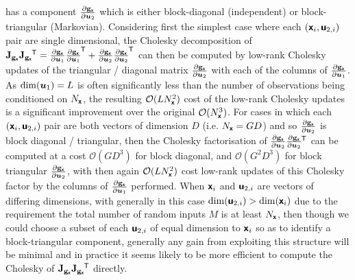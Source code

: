 has a component $\frac{\partial {\mathbf{g}}_{\boldsymbol{\mathsf{x}}}}{\partial \boldsymbol{u}_2}$ which is either block-diagonal (independent) or block-triangular (Markovian). Considering first the simplest case where each $(\boldsymbol{\mathsf{x}}_i,\boldsymbol{\mathsf{u}}_{2,i})$ pair are single dimensional, the Cholesky decomposition of $\mathbf{J}_{{\mathbf{g}}_{\boldsymbol{\mathsf{x}}}}\mathbf{J}_{{\mathbf{g}}_{\boldsymbol{\mathsf{x}}}}\phantom{}^{\mkern-1.5mu\mathsf{T}} = \frac{\partial {\mathbf{g}}_{\boldsymbol{\mathsf{x}}}}{\partial \boldsymbol{u}_1}\frac{\partial {\mathbf{g}}_{\boldsymbol{\mathsf{x}}}}{\partial \boldsymbol{u}_1}^{\mkern-1.5mu\mathsf{T}} + \frac{\partial {\mathbf{g}}_{\boldsymbol{\mathsf{x}}}}{\partial \boldsymbol{u}_2} \frac{\partial {\mathbf{g}}_{\boldsymbol{\mathsf{x}}}}{\partial \boldsymbol{u}_2}^{\mkern-1.5mu\mathsf{T}}$ can then be computed by low-rank Cholesky updates of the triangular / diagonal matrix $\frac{\partial {\mathbf{g}}_{\boldsymbol{\mathsf{x}}}}{\partial \boldsymbol{u}_2}$ with each of the columns of $\frac{\partial {\mathbf{g}}_{\boldsymbol{\mathsf{x}}}}{\partial \boldsymbol{u}_1}$. As $\dim(\boldsymbol{u}_1) = L$ is often significantly less than the number of observations being conditioned on $N_{\boldsymbol{\mathsf{x}}}$, the resulting $\mathcal{O}(LN_{\boldsymbol{\mathsf{x}}}^2)$ cost of the low-rank Cholesky updates is a significant improvement over the original $\mathcal{O}(N_{\boldsymbol{\mathsf{x}}}^3)$. For cases in which each $(\boldsymbol{\mathsf{x}}_i,\boldsymbol{\mathsf{u}}_{2,i})$ pair are both vectors of dimension $D$ (i.e. $N_{\boldsymbol{\mathsf{x}}} = GD$) and so $\frac{\partial {\mathbf{g}}_{\boldsymbol{\mathsf{x}}}}{\partial \boldsymbol{u}_2}$ is block diagonal / triangular, then the Cholesky factorisation of  $\frac{\partial {\mathbf{g}}_{\boldsymbol{\mathsf{x}}}}{\partial \boldsymbol{u}_2} \frac{\partial {\mathbf{g}}_{\boldsymbol{\mathsf{x}}}}{\partial \boldsymbol{u}_2}\phantom{}^{\mkern-1.5mu\mathsf{T}}$ can be computed at a cost $\mathcal{O}(G D^3)$ for block diagonal, and $\mathcal{O}(G^2 D^3)$ for block triangular $\frac{\partial {\mathbf{g}}_{\boldsymbol{\mathsf{x}}}}{\partial \boldsymbol{u}_2}$, with then again $\mathcal{O}(LN_{\boldsymbol{\mathsf{x}}}^2)$ cost low-rank updates of this Cholesky factor by the columns of $\frac{\partial {\mathbf{g}}_{\boldsymbol{\mathsf{x}}}}{\partial \boldsymbol{u}_1}$ performed. When $\boldsymbol{\mathsf{x}}_i$ and $\boldsymbol{\mathsf{u}}_{2,i}$ are vectors of differing dimensions, with generally in this case $\dim(\boldsymbol{\mathsf{u}}_{2,i}) > \dim(\boldsymbol{\mathsf{x}}_{i})$ due to the requirement the total number of random inputs $M$ is at least $N_{\boldsymbol{\mathsf{x}}}$, then though we could choose a subset of each $\boldsymbol{\mathsf{u}}_{2,i}$ of equal dimension to $\boldsymbol{\mathsf{x}}_i$ so as to identify a block-triangular component, generally any gain from exploiting this structure will be minimal and in practice it seems likely to be more efficient to compute the Cholesky of $\mathbf{J}_{{\mathbf{g}}_{\boldsymbol{\mathsf{x}}}}\mathbf{J}_{{\mathbf{g}}_{\boldsymbol{\mathsf{x}}}}\phantom{}^{\mkern-1.5mu\mathsf{T}}$ directly.


